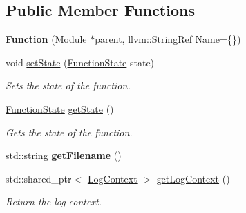 \subsection*{Public Member Functions}
\begin{DoxyCompactItemize}
\item 
\mbox{\label{classglow_1_1_function_a3d93675aea23aef06971152d96ef9ce3}} 
{\bfseries Function} (\hyperlink{classglow_1_1_module}{Module} $\ast$parent, llvm\+::\+String\+Ref Name=\{\})
\item 
\mbox{\label{classglow_1_1_function_a0e5dc1e1b10a595f5c2ceeb59e38226c}} 
void \hyperlink{classglow_1_1_function_a0e5dc1e1b10a595f5c2ceeb59e38226c}{set\+State} (\hyperlink{namespaceglow_a1c98da7214165b41c7d6b255503d4062}{Function\+State} state)
\begin{DoxyCompactList}\small\item\em Sets the state of the function. \end{DoxyCompactList}\item 
\mbox{\label{classglow_1_1_function_a9e85c7a5cd8e4986ec861ae0ebd58fe8}} 
\hyperlink{namespaceglow_a1c98da7214165b41c7d6b255503d4062}{Function\+State} \hyperlink{classglow_1_1_function_a9e85c7a5cd8e4986ec861ae0ebd58fe8}{get\+State} ()
\begin{DoxyCompactList}\small\item\em Gets the state of the function. \end{DoxyCompactList}\item 
\mbox{\label{classglow_1_1_function_aae6019209226269eb42b5f27fc99d615}} 
std\+::string {\bfseries get\+Filename} ()
\item 
\mbox{\label{classglow_1_1_function_ad6a16c8f354d8ba2316e47fc472d5305}} 
std\+::shared\+\_\+ptr$<$ \hyperlink{classglow_1_1_log_context}{Log\+Context} $>$ \hyperlink{classglow_1_1_function_ad6a16c8f354d8ba2316e47fc472d5305}{get\+Log\+Context} ()
\begin{DoxyCompactList}\small\item\em Return the log context. \end{DoxyCompactList}\item 
\mbox{\label{classglow_1_1_function_acabd268f7c23b3a67401f2df9a5a2540}} 

\end{DoxyCompactItemize}
